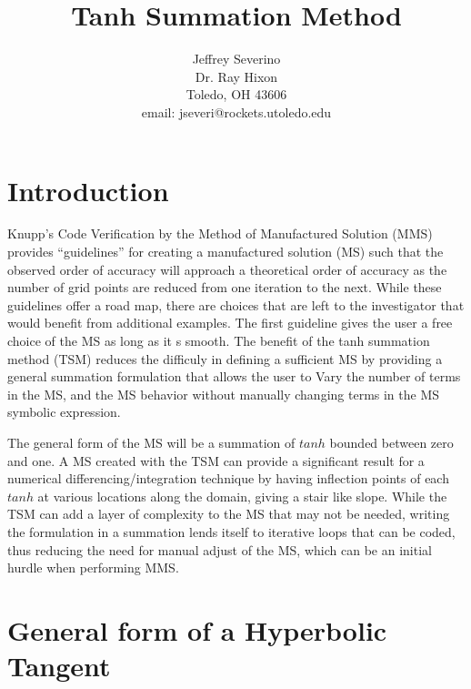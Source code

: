 \documentclass[a4paper]{article}
\begin{document}
\begin{titlepage}
    \title{Tanh Summation Method}
    \author{
        Jeffrey Severino \\
        Dr. Ray Hixon \\
        Toledo, OH 43606 \\
        email: jseveri@rockets.utoledo.edu \\
    }
\maketitle 
    
\end{titlepage}
\section{Introduction}

Knupp's Code Verification by the Method of Manufactured Solution (MMS) provides 
``guidelines'' for creating a manufactured solution (MS) such that the observed
order of accuracy will approach a theoretical order of accuracy as the number
of grid points are reduced from one iteration to the next. While these guidelines
offer a road map, there are choices that are left to the investigator that would
benefit from additional examples. The first guideline gives the user a free
choice of the MS as long as it s smooth. The benefit of the tanh summation method 
(TSM) reduces the difficuly in defining a sufficient MS by providing 
a general summation formulation that allows the user to Vary the number of 
terms in the MS, and the MS behavior without manually changing terms in the MS
symbolic expression. 

The general form of the MS will be a summation of $tanh$ bounded between zero
and one. A MS created with the TSM can provide a significant result for
a numerical differencing/integration technique by having inflection points of each
$tanh$ at various locations along the domain, giving a stair like slope.
While the TSM can add a layer of complexity to the MS that may not be needed, 
writing the formulation in a summation lends itself to iterative loops that can 
be coded, thus reducing the need for manual adjust of the MS, 
which can be an initial hurdle when performing MMS.


\section{General form of a Hyperbolic Tangent}
\end{document}

